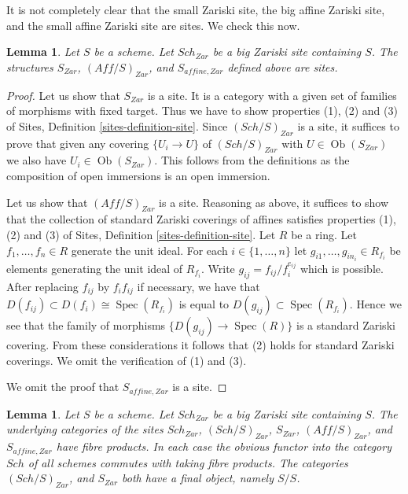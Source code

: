\documentclass{stacks-project}
\theoremstyle{plain}
\newtheorem{lemma}[subsection]{Lemma}
\theoremstyle{definition}
\theoremstyle{remark}
\numberwithin{equation}{subsection}
\def\Spec{\mathop{\mathrm{Spec}}}
\def\Sch{\mathit{Sch}}
\def\Ob{\mathop{\mathrm{Ob}}\nolimits}
\begin{document}
\noindent
It is not completely clear that the small Zariski site,
the big affine Zariski site, and the small affine Zariski site
are sites. We check this now.

\begin{lemma}
\label{lemma-verify-site-Zariski}
Let $S$ be a scheme. Let $\Sch_{Zar}$ be a big Zariski
site containing $S$. The structures $S_{Zar}$, $(\textit{Aff}/S)_{Zar}$,
and $S_{affine, Zar}$ defined above are sites.
\end{lemma}

\begin{proof}
Let us show that $S_{Zar}$ is a site. It is a category with a
given set of families of morphisms with fixed target. Thus we
have to show properties (1), (2) and (3) of
Sites, Definition \ref{sites-definition-site}.
Since $(\Sch/S)_{Zar}$ is a site, it suffices to prove
that given any covering $\{U_i \to U\}$ of $(\Sch/S)_{Zar}$
with $U \in \Ob(S_{Zar})$ we also have $U_i \in \Ob(S_{Zar})$.
This follows from the definitions
as the composition of open immersions is an open immersion.

\medskip\noindent
Let us show that $(\textit{Aff}/S)_{Zar}$ is a site.
Reasoning as above, it suffices to show that the collection
of standard Zariski coverings of affines satisfies properties
(1), (2) and (3) of
Sites, Definition \ref{sites-definition-site}.
Let $R$ be a ring. Let $f_1, \ldots, f_n \in R$ generate the unit ideal.
For each $i \in \{1, \ldots, n\}$ let $g_{i1}, \ldots, g_{in_i} \in R_{f_i}$
be elements generating the unit ideal of $R_{f_i}$. Write
$g_{ij} = f_{ij}/f_i^{e_{ij}}$ which is possible. After replacing
$f_{ij}$ by $f_i f_{ij}$ if necessary, we have that
$D(f_{ij}) \subset D(f_i) \cong \Spec(R_{f_i})$ is
equal to $D(g_{ij}) \subset \Spec(R_{f_i})$. Hence we see that
the family of morphisms $\{D(g_{ij}) \to \Spec(R)\}$
is a standard Zariski covering. From these considerations
it follows that (2) holds for standard Zariski coverings.
We omit the verification of (1) and (3).

\medskip\noindent
We omit the proof that $S_{affine, Zar}$ is a site.
\end{proof}

\begin{lemma}
\label{lemma-fibre-products-Zariski}
Let $S$ be a scheme. Let $\Sch_{Zar}$ be a big Zariski
site containing $S$. The underlying categories of the sites
$\Sch_{Zar}$, $(\Sch/S)_{Zar}$,
$S_{Zar}$, $(\textit{Aff}/S)_{Zar}$, and $S_{affine, Zar}$ have fibre products.
In each case the obvious functor into the category $\Sch$ of
all schemes commutes with taking fibre products. The categories
$(\Sch/S)_{Zar}$, and $S_{Zar}$ both have a final object,
namely $S/S$.
\end{lemma}
\end{document}
